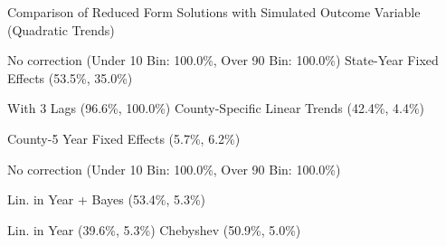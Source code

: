 \caption{Comparison of Reduced Form Solutions with Simulated Outcome Variable (Quadratic Trends) \label{fig:distributions-existing-solutions}}
\caption*{\color{p1line}{\textbf{\textemdash\textemdash}} No correction (Under 10 Bin: 100.0\%, Over 90 Bin: 100.0\%) \hspace{1cm} \color{p2line}{- - -} State-Year Fixed Effects (53.5\%, 35.0\%)}
\caption*{\color{p3line}{\textbf{- - -}} With 3 Lags (96.6\%, 100.0\%) \hspace{1cm} \color{p4line}{\textbf{- - -}} County-Specific Linear Trends (42.4\%, 4.4\%)}
\caption*{\color{p5line}{\textbf{- - -}} County-5 Year Fixed Effects (5.7\%, 6.2\%)}


\caption*{\color{p1line}{\textbf{\textemdash\textemdash}} No correction (Under 10 Bin: 100.0\%, Over 90 Bin: 100.0\%)}
\caption*{\color{p2line}{\textbf{- - -}} Lin. in Year + Bayes (53.4\%, 5.3\%)}
\caption*{\color{p3line}{\textbf{- - -}} Lin. in Year (39.6\%, 5.3\%) \hspace{1cm} \color{p4line}{\textbf{- - -}} Chebyshev (50.9\%, 5.0\%)}